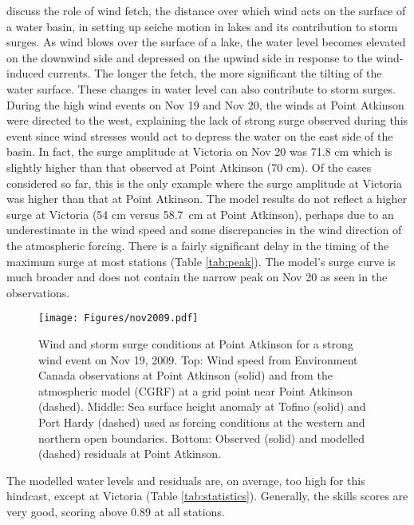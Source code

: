 \documentclass[letterpaper]{tATO2e}
\begin{document}
\citet{danard2003storm} discuss the role of wind fetch, the distance over which wind acts on the surface of a water basin, in setting up seiche motion in lakes and its contribution to storm surges. As wind blows over the surface of a lake, the water level becomes elevated on the downwind side and depressed on the upwind side in response to the wind-induced currents. The longer the fetch, the more significant the tilting of the water surface. These changes in water level can also contribute to storm surges.  During the high wind events on Nov 19 and Nov 20, the winds at Point Atkinson were directed to the west, explaining the lack of strong surge observed during this event since wind stresses would act to depress the water on the east side of the basin. In fact, the surge amplitude at Victoria on Nov 20 was {\color{red}71.8 cm} which is slightly higher than that observed at Point Atkinson {\color{red}(70 cm)}. Of the cases considered so far, this is the only example where the surge amplitude at Victoria was higher than that at Point Atkinson. The model results do not reflect a higher surge at Victoria {\color{red}(54 cm versus 58.7~cm at Point Atkinson)}, perhaps due to an underestimate in the wind speed and some discrepancies in the wind direction of the atmospheric forcing.  {\color{red} There is a fairly significant delay in the timing of the maximum surge at most stations (Table \ref{tab:peak}). The model's surge curve is much broader and does not contain the narrow peak on Nov 20 as seen in the observations.}


\begin{figure}
\centering
\texttt{[image: Figures/nov2009.pdf]}
\caption{Wind and storm surge conditions at Point Atkinson for a strong wind event on Nov 19, 2009. Top: Wind speed from Environment Canada observations \citep{ECClimateArchive} at Point Atkinson (solid) and from the atmospheric model (CGRF) at a grid point near Point Atkinson (dashed). Middle: Sea surface height anomaly at Tofino (solid) and Port Hardy (dashed) used as forcing conditions at the western and northern open boundaries. Bottom: Observed (solid) and modelled (dashed) residuals at Point Atkinson.  }
\label{fig:nov2009}
\end{figure}

The modelled water levels and residuals are, {\color{red} on average,} too high for this hindcast, except at Victoria (Table \ref{tab:statistics}).  Generally, the skills scores are very good, scoring above {\color{red} 0.89} at all stations. 
\end{document}

